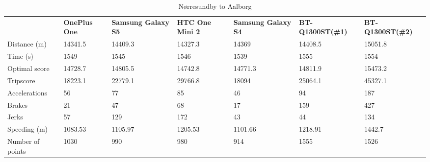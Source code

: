 \begin{table}[]
\centering
\caption{Nørresundby to Aalborg}
\label{my-label}
\begin{tabular}{|l|llllll|}
\hline
\rowcolor{tablegreen}

                 & \textbf{OnePlus One} & \textbf{Samsung Galaxy S5} & \textbf{HTC One Mini 2} & \textbf{Samsung Galaxy S4} & \textbf{BT-Q1300ST(\#1)} & \textbf{BT-Q1300ST(\#2)} \\
Distance (m)     & 14341.5     & 14409.3           & 14327.3        & 14369             & 14408.5         & 15051.8         \\
Time (s)         & 1549        & 1545              & 1546           & 1539              & 1555            & 1554            \\
Optimal score    & 14728.7     & 14805.5           & 14742.8        & 14771.3           & 14811.9         & 15473.2         \\
Tripscore        & 18223.1     & 22779.1           & 29766.8        & 18094             & 25064.1         & 45327.1         \\
Accelerations    & 56          & 77                & 85             & 46                & 94              & 187             \\
Brakes           & 21          & 47                & 68             & 17                & 159             & 427             \\
Jerks            & 57          & 129               & 172            & 43                & 44              & 134             \\
Speeding (m)     & 1083.53     & 1105.97           & 1205.53        & 1101.66           & 1218.91         & 1442.7          \\
Number of points & 1030        & 990               & 980            & 914               & 1555            & 1526            \\\hline
\end{tabular}
\end{table}